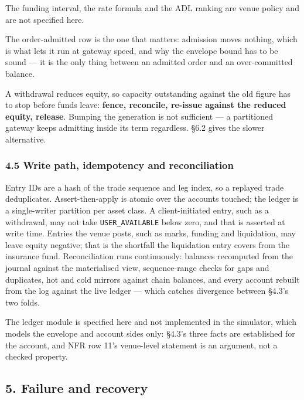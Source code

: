 \documentclass[10pt,a4paper]{article}
\begin{document}
The funding interval, the rate formula and the ADL ranking are venue policy and
are not specified here.

The order-admitted row is the one that matters: admission moves nothing, which is what
lets it run at gateway speed, and why the envelope bound has to be sound --- it is
the only thing between an admitted order and an over-committed balance.

A withdrawal reduces equity, so capacity outstanding against the old figure has
to stop before funds leave: \textbf{fence, reconcile, re-issue against the reduced
equity, release}. Bumping the generation is not sufficient --- a partitioned
gateway keeps admitting inside its term regardless. §6.2 gives the slower
alternative.

\subsubsection{4.5 Write path, idempotency and reconciliation}\label{write-path-idempotency-and-reconciliation}

Entry IDs are a hash of the trade sequence and leg index, so a replayed trade
deduplicates. Assert-then-apply is atomic over the accounts touched; the ledger
is a single-writer partition per asset class. A client-initiated entry, such as
a withdrawal, may not take \texttt{USER\_AVAILABLE} below zero, and that is asserted at
write time. Entries the venue posts, such as marks, funding and liquidation, may
leave equity negative; that is the shortfall the liquidation entry covers from
the insurance fund. Reconciliation runs continuously: balances recomputed from the journal
against the materialised view, sequence-range checks for gaps and duplicates, hot
and cold mirrors against chain balances, and every account rebuilt from the log
against the live ledger --- which catches divergence between §4.3's two folds.

The ledger module is specified here and not implemented in the simulator, which
models the envelope and account sides only: §4.3's three facts are established
for the account, and NFR row 11's venue-level statement is an argument, not a
checked property.



\label{start:6}%

\subsection{5. Failure and recovery}\label{failure-and-recovery}
\end{document}
